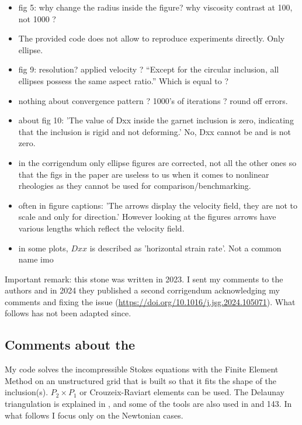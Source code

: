 \begin{itemize}
\item fig 5: why change the radius inside the figure? why viscosity contrast at 100, not 1000 ?

\item The provided code does not allow to reproduce experiments directly. Only ellipse. 

\item fig 9: resolution? applied velocity ? ``Except for the circular inclusion, all ellipses possess the same aspect ratio.'' Which is equal to ?

\item nothing about convergence pattern ? 1000's of iterations ? round off errors.

\item about fig 10: 'The value of Dxx inside the garnet inclusion is zero, indicating that the inclusion is rigid and not deforming.' 
No, Dxx cannot be and is not zero. 

\item in the corrigendum only ellipse figures are corrected, not all the other ones so that the figs in the paper are useless 
to us when it comes to nonlinear rheologies as they cannot be used for comparison/benchmarking.

\item often in figure captions: 'The arrows display the velocity field, they are not to scale and only for direction.'
However looking at the figures arrows have various lengths which reflect the velocity field.

\item in some plots, $Dxx$ is described as 'horizontal strain rate'. Not a common name imo

\end{itemize}

{\color{violet} Important remark: this stone was written in 2023. I sent my comments 
to the authors and in 2024 they published a second corrigendum acknowledging my 
comments and fixing the issue (\url{https://doi.org/10.1016/j.jsg.2024.105071}). 
What follows has not been adapted since.}


\subsection*{Comments about the \stone}

My code solves the incompressible Stokes equations with the Finite Element Method
on an unstructured grid that is built so that it fits the shape of the inclusion(s).
$P_2\times P_1$ or Crouzeix-Raviart elements can be used.
The Delaunay triangulation is explained in , and 
some of the tools are also used in  and 143.
In what follows I focus only on the Newtonian cases.

